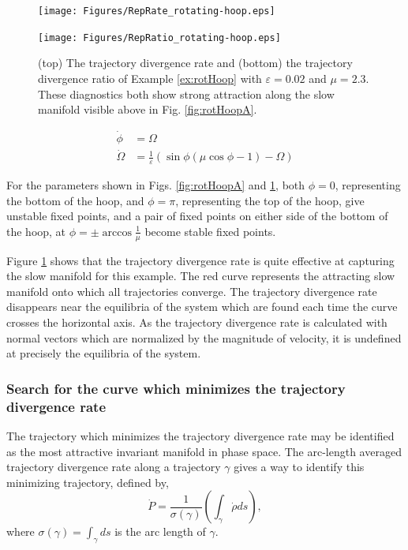\documentclass[twocolumn]{svjour3}
\begin{document}
\begin{figure}
\begin{minipage}{3.2in}
\centering
\texttt{[image: Figures/RepRate\_rotating-hoop.eps]}
\end{minipage}
\begin{minipage}{3.2in}
\centering
\texttt{[image: Figures/RepRatio\_rotating-hoop.eps]}
\end{minipage}
\caption{\label{fig:rotHoopB} (top) The trajectory divergence rate and (bottom) the trajectory divergence ratio of Example \ref{ex:rotHoop} with $\varepsilon = 0.02$ and $\mu = 2.3$. These diagnostics both show strong attraction along the slow manifold visible above in Fig. \ref{fig:rotHoopA}.}
\end{figure}

\begin{equation}
\begin{aligned}
\dot{\phi} & = \Omega \\
\dot{\Omega } & = \frac{1}{\varepsilon}\left(\sin\phi(\mu\cos\phi - 1) - \Omega\right)
\end{aligned}
\label{eq:rotHoop}
\end{equation}

For the parameters shown in Figs. \ref{fig:rotHoopA} and \ref{fig:rotHoopB}, both $\phi=0$, representing the bottom of the hoop, and $\phi=\pi$, representing the top of the hoop, give unstable fixed points, and a pair of fixed points on either side of the bottom of the hoop, at $\phi=\pm\arccos\tfrac{1}{\mu}$ become stable fixed points.

Figure \ref{fig:rotHoopB} shows that the trajectory divergence rate is quite effective at capturing the slow manifold for this example. The red curve represents the attracting slow manifold onto which all trajectories converge. The trajectory divergence rate disappears near the equilibria of the system which are found each time the curve crosses the horizontal axis. As the trajectory divergence rate is calculated with normal vectors which are normalized by the magnitude of velocity, it is undefined at precisely the equilibria of the system.

\subsubsection{Search for the curve which minimizes the trajectory divergence rate}
The trajectory which minimizes the trajectory divergence rate may be identified as the most attractive invariant manifold in phase space. The arc-length averaged trajectory divergence rate along a trajectory $\gamma$ gives a way to identify this minimizing trajectory, defined by,
\begin{equation}
\dot{P}=\frac{1}{\sigma(\gamma)}\left(\int_\gamma\dot{\rho}ds\right),
\end{equation}
where $\sigma(\gamma)=\int_{\gamma}ds$ is the arc length of $\gamma$.
\end{document}

